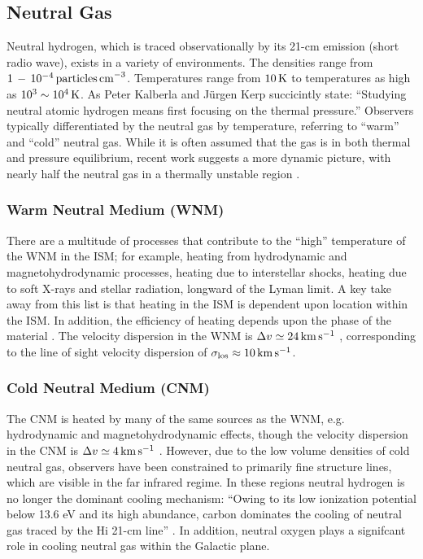 \documentclass[../dissertation.tex]{subfiles}
\begin{document}
\subsection{Neutral Gas}
Neutral hydrogen, which is traced observationally by its 21-cm emission (short radio wave), exists in a variety of environments. 
The densities range from $1 \,  - \, 10^{-4} \, {\rm particles \, cm}^{-3}$.
Temperatures range from $10 \, {\rm K}$ to temperatures as high as $10^3 \sim 10^4 \, {\rm K}$. 
As Peter Kalberla and J{\"u}rgen Kerp succicintly state: 
``Studying neutral atomic hydrogen means first focusing on the thermal pressure.'' \citep[p. 47]{2009ARA&A..47...27K}
Observers typically differentiated by the neutral gas by temperature, referring to ``warm'' and ``cold'' neutral gas. While it is often assumed that the gas is in both thermal and pressure equilibrium, recent work suggests a more dynamic picture, with nearly half the neutral gas in a thermally unstable region \citep{2003ApJ...586.1067H}. 

\subsubsection{Warm Neutral Medium (WNM)} %
There are a multitude of processes that contribute to the ``high'' temperature of the WNM in the ISM; 
for example, heating from hydrodynamic and magnetohydrodynamic processes, heating due to interstellar shocks, heating due to soft X-rays and stellar radiation, longward of the Lyman limit.
A key take away from this list is that heating in the ISM is dependent upon location within the ISM. 
In addition, the efficiency of heating depends upon the phase of the material \citep[p. 48]{2009ARA&A..47...27K}. 
The velocity dispersion in the WNM is $\Delta v \simeq 24 \,\rm km\,s^{-1}$ \citep[p. 49]{2009ARA&A..47...27K}, corresponding to the line of sight velocity dispersion of $\sigma_{\rm los} \approx 10 \,\rm km\,s^{-1}$.


\subsubsection{Cold Neutral Medium (CNM)}
The CNM is heated by many of the same sources as the WNM, 
e.g. hydrodynamic and magnetohydrodynamic effects, though the velocity dispersion in the CNM is $\Delta v \simeq 4 \,\rm km\,s^{-1}$ \citep[p. 49]{2009ARA&A..47...27K}.
However, due to the low volume densities of cold neutral gas, observers have been constrained to 
primarily fine structure lines, which are visible in the far infrared regime. 
In these regions neutral hydrogen is no longer the dominant cooling mechanism: 
``Owing to its low ionization potential below 13.6 eV and its high abundance, carbon dominates the cooling of neutral gas traced by the Hi 21-cm line'' \citep[p. 48]{2009ARA&A..47...27K}. 
In addition, neutral oxygen plays a signifcant role in cooling neutral gas within the Galactic plane.
\end{document}
